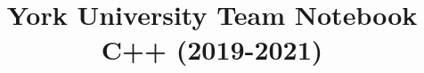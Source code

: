 \documentclass[11pt]{article}
\title{\vspace{-4ex}\Large{York University Team Notebook C++ (2019-2021)}}
\author{}
\date{}
\begin{document}
\begin{landscape}
\begin{multicols}{2}

\maketitle
\vspace{-13ex}
\tableofcontents
\pagestyle{fancy}



\end{multicols}
\end{landscape}
\end{document}
